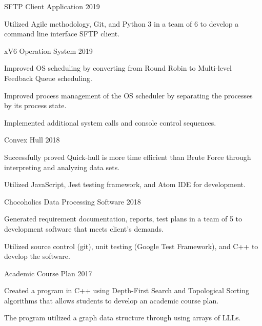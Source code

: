 
\begin{cventries}
  \cvproject
    {SFTP Client Application} %
    {2019} %
    {
      \begin{cvitems} %
        \item {Utilized Agile methodology, Git, and Python 3 in a team of 6 to develop a command line interface SFTP client.}
      \end{cvitems}
    }

 \cvproject
    {xV6 Operation System} %
    {2019} %
    {
      \begin{cvitems} %
        \item {Improved OS scheduling by converting from Round Robin to Multi-level Feedback Queue scheduling.}
        \item {Improved process management of the OS scheduler by separating the processes by its process state.}
        \item {Implemented additional system calls and console control sequences.}
      \end{cvitems}
    }

  \cvproject
     {Convex Hull}
     {2018}
     {
       \begin{cvitems}
         \item {Successfully proved Quick-hull is more time efficient than Brute Force through interpreting and analyzing data sets.}
         \item {Utilized JavaScript, Jest testing framework, and Atom IDE for development.}
       \end{cvitems}
     }

  \cvproject
  {Chocoholics Data Processing Software}
  {2018}
  {
    \begin{cvitems}
      \item {Generated requirement documentation, reports, test plans in a team of 5 to development software that meets client's demands.}
      \item {Utilized source control (git), unit testing (Google Test Framework), and C++ to develop the software.}
    \end{cvitems}
  }

  \cvproject
    {Academic Course Plan}
    {2017}
    {
       \begin{cvitems}
         \item {Created a program in C++ using Depth-First Search and Topological Sorting algorithms that allows students to develop an academic course plan.}
         \item {The program utilized a graph data structure through using arrays of LLLs.}
      \end{cvitems}
    }

\end{cventries}
